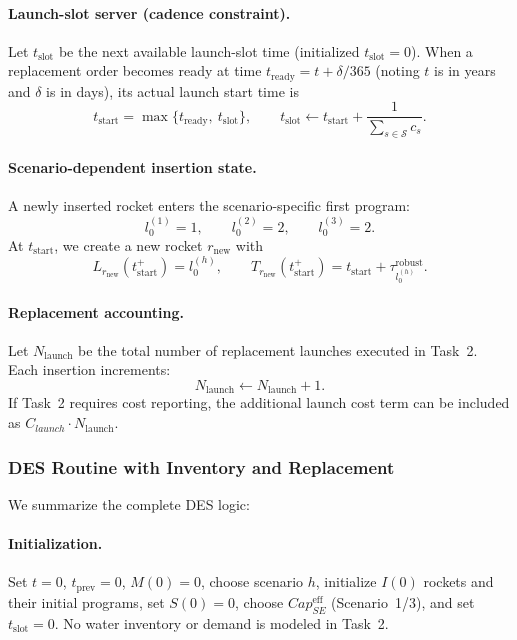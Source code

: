 ﻿\documentclass{mcmthesis}
\begin{document}
\paragraph{Launch-slot server (cadence constraint).}
Let $t_{\text{slot}}$ be the next available launch-slot time (initialized $t_{\text{slot}}=0$).
When a replacement order becomes ready at time $t_{\text{ready}}=t+\delta/365$ (noting $t$ is in years and $\delta$ is in days), its actual launch start time is
\[
t_{\text{start}}=\max\{t_{\text{ready}},\ t_{\text{slot}}\},\qquad
t_{\text{slot}} \leftarrow t_{\text{start}}+\frac{1}{\sum_{s\in\mathcal{S}} c_s}.
\]

\paragraph{Scenario-dependent insertion state.}
A newly inserted rocket enters the scenario-specific first program:
\[
l_0^{(1)}=1,\qquad l_0^{(2)}=2,\qquad l_0^{(3)}=2.
\]
At $t_{\text{start}}$, we create a new rocket $r_{\text{new}}$ with
\[
L_{r_{\text{new}}}(t_{\text{start}}^+)=l_0^{(h)},\qquad
T_{r_{\text{new}}}(t_{\text{start}}^+)=t_{\text{start}}+\tau_{l_0^{(h)}}^{\text{robust}}.
\]

\paragraph{Replacement accounting.}
Let $N_{\text{launch}}$ be the total number of replacement launches executed in Task~2.
Each insertion increments:
\[
N_{\text{launch}} \leftarrow N_{\text{launch}}+1.
\]
If Task~2 requires cost reporting, the additional launch cost term can be included as
$C_{launch}\cdot N_{\text{launch}}$.

\subsubsection{DES Routine with Inventory and Replacement}
\label{sec:model2_des_routine}

We summarize the complete DES logic:

\paragraph{Initialization.}
Set $t=0$, $t_{\text{prev}}=0$, $M(0)=0$, choose scenario $h$, initialize $I(0)$ rockets and their initial programs,
set $S(0)=0$, choose $Cap_{SE}^{\text{eff}}$ (Scenario~1/3), and set $t_{\text{slot}}=0$. No water inventory or demand is modeled in Task~2.
\end{document}
